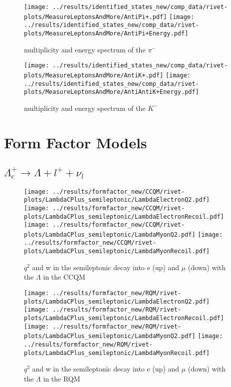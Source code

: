 \begin{figure}[h]
  \centering
  \texttt{[image: ../results/identified\_states\_new/comp\_data/rivet-plots/MeasureLeptonsAndMore/AntiPi+.pdf]}
  \texttt{[image: ../results/identified\_states\_new/comp\_data/rivet-plots/MeasureLeptonsAndMore/AntiPi+Energy.pdf]}
  \caption{multiplicity and energy spectrum of the \(\pi^-\)}
\end{figure}
\begin{figure}[h]
  \centering
  \texttt{[image: ../results/identified\_states\_new/comp\_data/rivet-plots/MeasureLeptonsAndMore/AntiK+.pdf]}
  \texttt{[image: ../results/identified\_states\_new/comp\_data/rivet-plots/MeasureLeptonsAndMore/AntiAntiK+Energy.pdf]}
  \caption{multiplicity and energy spectrum of the \(K^-\)}
\end{figure}

\section{Form Factor Models} \label{a:ffm}
\subsection{\(\Lambda_c^+ \rightarrow \Lambda + l^+ + \nu_l\)}
\begin{figure}[h]
  \centering
  \texttt{[image: ../results/formfactor\_new/CCQM/rivet-plots/LambdaCPlus\_semileptonic/LambdaElectronQ2.pdf]}
  \texttt{[image: ../results/formfactor\_new/CCQM/rivet-plots/LambdaCPlus\_semileptonic/LambdaElectronRecoil.pdf]}\\
  \texttt{[image: ../results/formfactor\_new/CCQM/rivet-plots/LambdaCPlus\_semileptonic/LambdaMyonQ2.pdf]}
  \texttt{[image: ../results/formfactor\_new/CCQM/rivet-plots/LambdaCPlus\_semileptonic/LambdaMyonRecoil.pdf]}
  \caption{\(q^2\) and w in the semileptonic decay into e (up) and \(\mu\) (down) with the \(\Lambda\) in the CCQM}
\end{figure}
\begin{figure}[h]
  \centering
  \texttt{[image: ../results/formfactor\_new/RQM/rivet-plots/LambdaCPlus\_semileptonic/LambdaElectronQ2.pdf]}
  \texttt{[image: ../results/formfactor\_new/RQM/rivet-plots/LambdaCPlus\_semileptonic/LambdaElectronRecoil.pdf]}\\
  \texttt{[image: ../results/formfactor\_new/RQM/rivet-plots/LambdaCPlus\_semileptonic/LambdaMyonQ2.pdf]}
  \texttt{[image: ../results/formfactor\_new/RQM/rivet-plots/LambdaCPlus\_semileptonic/LambdaMyonRecoil.pdf]}
  \caption{\(q^2\) and w in the semileptonic decay into e (up) and \(\mu\) (down) with the \(\Lambda\) in the RQM}
\end{figure}

